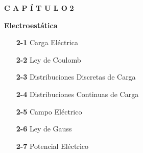 \thispagestyle{empty} %

\begin{minipage}[l]{0.35\textwidth}
    \hfill
\end{minipage}
\hfill
\begin{minipage}[c]{0.6\textwidth}
    \begin{flushleft}

        \vspace*{3cm} %

        \begin{center}
            \fontsize{30}{50}\selectfont
            \textbf{C A P Í T U L O}
            \hspace{0.2em}
            \fontsize{90}{100}\selectfont
            \textbf{2}
        \end{center}

        \vspace{1cm} %

        \begin{center}
            \fontsize{40}{60}\selectfont
            \color{LightGray}
            \textbf{Electroestática}
        \end{center}

        \vspace{2.5cm} %

        \begin{minipage}{0.6\textwidth} %
        \raggedright
        \linespread{1.5}\selectfont %
            \begin{itemize}
                \item[\textbf{2-1}] Carga Eléctrica
                \item[\textbf{2-2}] Ley de Coulomb
                \item[\textbf{2-3}] Distribuciones Discretas de Carga
                \item[\textbf{2-4}] Distribuciones Continuas de Carga
                \item[\textbf{2-5}] Campo Eléctrico
                \item[\textbf{2-6}] Ley de Gauss
                \item[\textbf{2-7}] Potencial Eléctrico
            \end{itemize}
        \end{minipage}

        \vspace*{\fill} %
    \end{flushleft}
\end{minipage}

\newpage %

